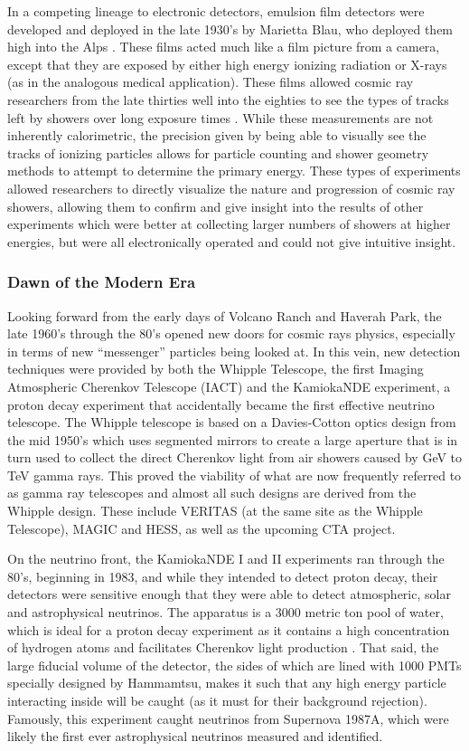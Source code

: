 In a competing lineage to electronic detectors, emulsion film detectors were developed and deployed in the late 1930's by Marietta Blau, who deployed them high into the Alps \cite{ultraray_blau}. These films acted much like a film picture from a camera, except that they are exposed by either high energy ionizing radiation or X-rays (as in the analogous medical application). These films allowed cosmic ray researchers from the late thirties well into the eighties to see the types of tracks left by showers over long exposure times \cite{crapp}. While these measurements are not inherently calorimetric, the precision given by being able to visually see the tracks of ionizing particles allows for particle counting and shower geometry methods to attempt to determine the primary energy. These types of experiments allowed researchers to directly visualize the nature and progression of cosmic ray showers, allowing them to confirm and give insight into the results of other experiments which were better at collecting larger numbers of showers at higher energies, but were all electronically operated and could not give intuitive insight. 

\subsubsection*{Dawn of the Modern Era}

Looking forward from the early days of Volcano Ranch and Haverah Park, the late 1960's through the 80's opened new doors for cosmic rays physics, especially in terms of new ``messenger'' particles being looked at. In this vein, new detection techniques were provided by both the Whipple Telescope, the first Imaging Atmospheric Cherenkov Telescope (IACT) and the KamiokaNDE experiment, a proton decay experiment that accidentally became the first effective neutrino telescope. The Whipple telescope is based on a Davies-Cotton optics design from the mid 1950's which uses segmented mirrors to create a large aperture that is in turn used to collect the direct Cherenkov light from air showers caused by GeV to TeV gamma rays. This proved the viability of what are now frequently referred to as gamma ray telescopes and almost all such designs are derived from the Whipple design. These include VERITAS (at the same site as the Whipple Telescope), MAGIC and HESS, as well as the upcoming CTA project.  

On the neutrino front, the KamiokaNDE I and II experiments ran through the 80's, beginning in 1983, and while they intended to detect proton decay, their detectors were sensitive enough that they were able to detect atmospheric, solar and astrophysical neutrinos. The apparatus is a 3000 metric ton pool of water, which is ideal for a proton decay experiment as it contains a high concentration of hydrogen atoms and facilitates Cherenkov light production \cite{kamiokande}. That said, the large fiducial volume of the detector, the sides of which are lined with 1000 PMTs specially designed by Hammamtsu, makes it such that any high energy particle interacting inside will be caught (as it must for their background rejection). Famously, this experiment caught neutrinos from Supernova 1987A, which were likely the first ever astrophysical neutrinos measured and identified. 

